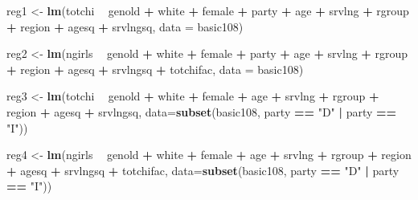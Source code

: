 \documentclass[]{article}
\newenvironment{Shaded}{\begin{snugshade}}{\end{snugshade}}
\newcommand{\KeywordTok}[1]{\textcolor[rgb]{0.13,0.29,0.53}{\textbf{#1}}}
\newcommand{\DataTypeTok}[1]{\textcolor[rgb]{0.13,0.29,0.53}{#1}}
\newcommand{\StringTok}[1]{\textcolor[rgb]{0.31,0.60,0.02}{#1}}
\newcommand{\OperatorTok}[1]{\textcolor[rgb]{0.81,0.36,0.00}{\textbf{#1}}}
\newcommand{\NormalTok}[1]{#1}
\begin{document}
\begin{Shaded}
\begin{Highlighting}[]
\NormalTok{reg1 <-}\StringTok{ }\KeywordTok{lm}\NormalTok{(totchi }\OperatorTok{~}\StringTok{ }\NormalTok{genold }\OperatorTok{+}\StringTok{ }\NormalTok{white }\OperatorTok{+}\StringTok{ }\NormalTok{female }\OperatorTok{+}\StringTok{ }\NormalTok{party }\OperatorTok{+}\StringTok{ }\NormalTok{age }\OperatorTok{+}\StringTok{ }\NormalTok{srvlng }\OperatorTok{+}\StringTok{ }\NormalTok{rgroup }\OperatorTok{+}\StringTok{ }\NormalTok{region }\OperatorTok{+}\StringTok{ }\NormalTok{agesq }\OperatorTok{+}\StringTok{ }\NormalTok{srvlngsq, }\DataTypeTok{data =}\NormalTok{ basic108)}

\NormalTok{reg2 <-}\StringTok{ }\KeywordTok{lm}\NormalTok{(ngirls }\OperatorTok{~}\StringTok{ }\NormalTok{genold }\OperatorTok{+}\StringTok{ }\NormalTok{white }\OperatorTok{+}\StringTok{ }\NormalTok{female }\OperatorTok{+}\StringTok{ }\NormalTok{party }\OperatorTok{+}\StringTok{ }\NormalTok{age }\OperatorTok{+}\StringTok{ }\NormalTok{srvlng }\OperatorTok{+}\StringTok{ }\NormalTok{rgroup }\OperatorTok{+}\StringTok{ }\NormalTok{region }\OperatorTok{+}\StringTok{ }\NormalTok{agesq }\OperatorTok{+}\StringTok{ }\NormalTok{srvlngsq }\OperatorTok{+}\StringTok{ }\NormalTok{totchifac, }\DataTypeTok{data =}\NormalTok{ basic108)}

\NormalTok{reg3 <-}\StringTok{ }\KeywordTok{lm}\NormalTok{(totchi }\OperatorTok{~}\StringTok{ }\NormalTok{genold }\OperatorTok{+}\StringTok{ }\NormalTok{white }\OperatorTok{+}\StringTok{ }\NormalTok{female }\OperatorTok{+}\StringTok{ }\NormalTok{age }\OperatorTok{+}\StringTok{ }\NormalTok{srvlng }\OperatorTok{+}\StringTok{ }\NormalTok{rgroup }\OperatorTok{+}\StringTok{ }\NormalTok{region }\OperatorTok{+}\StringTok{ }\NormalTok{agesq }\OperatorTok{+}\StringTok{ }\NormalTok{srvlngsq, }\DataTypeTok{data=}\KeywordTok{subset}\NormalTok{(basic108, party }\OperatorTok{==}\StringTok{ "D"} \OperatorTok{|}\StringTok{ }\NormalTok{party }\OperatorTok{==}\StringTok{ "I"}\NormalTok{))}

\NormalTok{reg4 <-}\StringTok{ }\KeywordTok{lm}\NormalTok{(ngirls }\OperatorTok{~}\StringTok{ }\NormalTok{genold }\OperatorTok{+}\StringTok{ }\NormalTok{white }\OperatorTok{+}\StringTok{ }\NormalTok{female }\OperatorTok{+}\StringTok{ }\NormalTok{age }\OperatorTok{+}\StringTok{ }\NormalTok{srvlng }\OperatorTok{+}\StringTok{ }\NormalTok{rgroup }\OperatorTok{+}\StringTok{ }\NormalTok{region }\OperatorTok{+}\StringTok{ }\NormalTok{agesq }\OperatorTok{+}\StringTok{ }\NormalTok{srvlngsq }\OperatorTok{+}\StringTok{ }\NormalTok{totchifac, }\DataTypeTok{data=}\KeywordTok{subset}\NormalTok{(basic108, party }\OperatorTok{==}\StringTok{ "D"} \OperatorTok{|}\StringTok{ }\NormalTok{party }\OperatorTok{==}\StringTok{ "I"}\NormalTok{))}


\end{Highlighting}
\end{Shaded}
\end{document}
